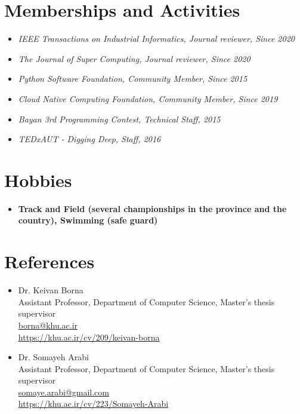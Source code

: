 \documentclass[letterpaper,11pt]{article}
\newcommand{\resumeSubHeadingListStart}{\begin{itemize}[leftmargin=*]}
\newcommand{\resumeSubHeadingListEnd}{\end{itemize}}
\begin{document}
{%
\section{Memberships and Activities}
 \resumeSubHeadingListStart
   \item{\textit{IEEE Transactions on Industrial Informatics, Journal reviewer, Since 2020}}
   \item{\textit{The Journal of Super Computing, Journal reviewer, Since 2020}}
   \item{\textit{Python Software Foundation, Community Member, Since 2015}}
   \item{\textit{Cloud Native Computing Foundation, Community Member, Since 2019}}
   \item{\textit{Bayan 3rd Programming Contest, Technical Staff, 2015}} 
   \item{\textit{TEDxAUT - Digging Deep, Staff, 2016}} 
 \resumeSubHeadingListEnd
 
\section{Hobbies}
 \resumeSubHeadingListStart
   \item{\textbf{Track and Field (several championships in the province and the country), Swimming (safe guard)}}
 \resumeSubHeadingListEnd


\section{References}
\begin{itemize}
	\item
	Dr. Keivan Borna\\
		Assistant Professor, Department of Computer Science, Master's thesis supervisor\\
	\href{mailto:borna@khu.ac.ir}{borna@khu.ac.ir}\\
	 {\href{https://khu.ac.ir/cv/209/keivan-borna?slc_lang=en&&cv=209&mod=scv}{\small{https://khu.ac.ir/cv/209/keivan-borna}}}\\\-

\item
	Dr. Somayeh Arabi\\
		Assistant Professor, Department of Computer Science, Master's thesis supervisor\\
	\href{mailto:somaye.arabi@gmail.com}{somaye.arabi@gmail.com}\\
	 {\href{https://khu.ac.ir/cv/223/Somayeh-Arabi?slc_lang=en&&cv=223&mod=scv}{\small{https://khu.ac.ir/cv/223/Somayeh-Arabi}}}\\\-
	 

\end{itemize}}
\end{document}
